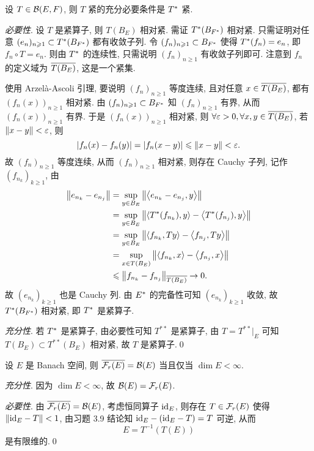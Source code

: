 	\begin{Theorem}
		设 $ T\in\CB(E, F) $, 则 $ T $ 紧的充分必要条件是 $ \Star{T} $ 紧.
	\end{Theorem}
	\begin{Proof}
		\textsl{必要性}. 设 $ T $ 是紧算子, 则 $ T(B_{E}) $ 相对紧. 需证 $ \Star{T}(B_{\Star{F}}) $ 相对紧. 只需证明对任意 $ (e_{n})_{n\geqslant1}\subset \Star{T}(B_{\Star{F}}) $ 都有收敛子列. 令 $ (f_{n})_{n\geqslant1}\subset B_{\Star{F}} $ 使得 $ \Star{T}(f_{n})=e_{n} $, 即 $ f_{n}\circ T=e_{n} $. 则由 $ \Star{T} $ 的连续性, 只需说明 $ (f_{n})_{n\geqslant1} $ 有收敛子列即可. 注意到 $ f_{n} $ 的定义域为 $ \baro{T(B_{E})} $, 这是一个紧集.

		使用 Arzel\`a-Ascoli 引理, 要说明 $ (f_{n})_{n\geqslant1} $ 等度连续, 且对任意 $ x\in\baro{T(B_{E})} $, 都有 $ (f_{n}(x))_{n\geqslant1} $ 相对紧. 由 $ (f_{n})_{n\geqslant1}\subset B_{\Star{F}} $ 知 $ (f_{n})_{n\geqslant1} $ 有界, 从而 $ (f_{n}(x))_{n\geqslant1} $ 有界. 于是 $ (f_{n}(x))_{n\geqslant1} $ 相对紧, 则 $ \forall\varepsilon>0, \forall x, y\in\baro{T(B_{E})} $, 若 $ \norm{x-y}<\varepsilon $, 则
		\[
			\abs{f_{n}(x)-f_{n}(y)} = \abs{f_{n}(x-y)}\leqslant\norm{x-y}<\varepsilon.
		\] 
		故 $ (f_{n})_{n\geqslant1} $ 等度连续, 从而 $ (f_{n})_{n\geqslant1} $ 相对紧, 则存在 Cauchy 子列,
		记作 $ (f_{n_{k}})_{k\geqslant1} $, 由
		\[
			\begin{aligned}
				\norm{e_{n_{k}}-e_{n_{j}}} & = \sup_{y\in B_{E}}\norm{\lrangle{e_{n_{k}}-e_{n_{j}}, y}} \\
				& = \sup_{y\in B_{E}}\norm{\lrangle{\Star{T}(f_{n_{k}}), y}-\lrangle{\Star{T}(f_{n_{j}}), y}}\\
				& = \sup_{y\in B_{E}}\norm{\lrangle{f_{n_{k}}, Ty}-\lrangle{f_{n_{j}}, Ty}}\\
				& =  \sup_{x\in T(B_{E})}\norm{\lrangle{f_{n_{k}}, x}-\lrangle{f_{n_{j}}, x}}\\
				& \leqslant \norm{f_{n_{k}}-f_{n_{j}}}_{\baro{T(B_{E})}}\to 0.
			\end{aligned}
		\]
		故 $ (e_{n_{k}})_{k\geqslant1} $ 也是 Cauchy 列. 由 $ \Star{E} $ 的完备性可知 $ (e_{n_{k}})_{k\geqslant1} $ 收敛, 故 $ \Star{T}(B_{\Star{F}}) $ 相对紧, 即 $ \Star{T} $ 是紧算子.

		\textsl{充分性}. 若 $ \Star{T} $ 是紧算子, 由必要性可知 $ T^{**} $ 是紧算子, 由 $ T = T^{**}|_{E} $ 可知 $ T(B_{E})\subset T^{**}(B_{E}) $ 相对紧, 故 $ T $ 是紧算子.\qed
	\end{Proof}

	\begin{Proposition}
		设 $ E $ 是 Banach 空间, 则 $ \baro{\Fr(E)}=\CB(E) $ 当且仅当 $ \dim E<\infty $.
	\end{Proposition}
	\begin{Proof}
		\textsl{充分性}. 因为 $ \dim E<\infty $, 故 $ \CB(E)=\Fr(E) $.

		\textsl{必要性}. 由 $ \baro{\Fr(E)}=\CB(E) $, 考虑恒同算子 $ \id_{E} $, 则存在 $ T\in\Fr(E) $ 使得 $ \norm{\id_{E}-T}<1 $, 由习题 3.9 结论知 $ \id_{E}-(\id_{E}-T)=T $ 可逆, 从而
		\[
			E = T^{-1}(T(E))
		\]
		是有限维的.\qed
	\end{Proof}

